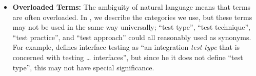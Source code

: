 \begin{itemize}
    \item \textbf{Overloaded Terms:} The ambiguity of natural language means
          that terms are often overloaded. In , we describe
          the categories we use, but these terms may not be used in the same
          way universally; ``test type'', ``test technique'', ``test practice'',
          and ``test approach'' could all reasonably used as synonyms. For
          example, \citet[p.~45\ifnotpaper, emphasis added\fi]{Kam2008}
          defines interface testing as ``an integration \emph{test type} that
          is concerned with testing \dots{} interfaces'', but since \ifnotpaper
              he \else it \fi does not define ``test type'', this may not have
          special significance.
\end{itemize}

